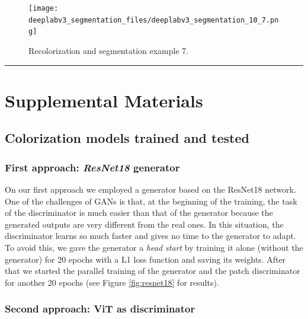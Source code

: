 \documentclass[
]{article}
\begin{document}
\begin{figure}
\centering
\texttt{[image: deeplabv3\_segmentation\_files/deeplabv3\_segmentation\_10\_7.png]}
\caption{Recolorization and segmentation example 7.}
\label{fig:segmentation-and-blending-7}
\end{figure}

\begin{center}\rule{0.5\linewidth}{0.5pt}\end{center}
\clearpage
\hypertarget{supplemental-materials}{%
\section{Supplemental Materials}\label{supplemental-materials}}

\hypertarget{colorization-models-trained-and-tested}{%
\subsection{Colorization models trained and
tested}\label{colorization-models-trained-and-tested}}

\hypertarget{first-approach-resnet18-generator}{%
\subsubsection{\texorpdfstring{First approach: \emph{ResNet18}
generator}{First approach: ResNet18 generator}}\label{first-approach-resnet18-generator}}

On our first approach we employed a generator based on the ResNet18
network. One of the challenges of GANs is that, at the beginning of the
training, the task of the discriminator is much easier than that of the
generator because the generated outputs are very different from the real
ones. In this situation, the discriminator learns so much faster and
gives no time to the generator to adapt. To avoid this, we gave the
generator a \emph{head start} by training it alone (without the
generator) for 20 epochs with a L1 loss function and saving its weights.
After that we started the parallel training of the generator and the
patch discriminator for another 20 epochs (see Figure \ref{fig:resnet18} for results).

\hypertarget{second-approach-vit-as-discriminator}{%
\subsubsection{Second approach: ViT as
discriminator}\label{second-approach-vit-as-discriminator}}
\end{document}
